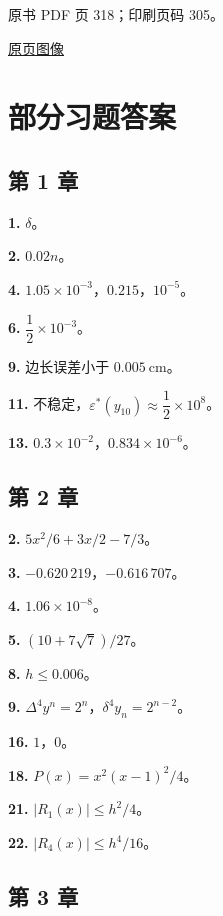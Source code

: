 \clearpage

原书 PDF 页 318；印刷页码 305。

\href{source-images/pdf-318.jpeg}{原页图像}

\section{部分习题答案}\label{back-ux90e8ux5206ux4e60ux9898ux7b54ux6848}

\subsection{第 1 章}\label{back-ux7b2c-1-ux7ae0}

\textbf{1.} \(\delta\)。

\textbf{2.} \(0.02n\)。

\textbf{4.} \(1.05\times10^{-3}\)，\(0.215\)，\(10^{-5}\)。

\textbf{6.} \(\dfrac{1}{2}\times10^{-3}\)。

\textbf{9.} 边长误差小于 \(0.005\ \mathrm{cm}\)。

\textbf{11.} 不稳定，\(\varepsilon^*(y_{10})\approx\dfrac{1}{2}\times10^8\)。

\textbf{13.} \(0.3\times10^{-2}\)，\(0.834\times10^{-6}\)。

\subsection{第 2 章}\label{back-ux7b2c-2-ux7ae0}

\textbf{2.} \(5x^2/6+3x/2-7/3\)。

\textbf{3.} \(-0.620\,219\)，\(-0.616\,707\)。

\textbf{4.} \(1.06\times10^{-8}\)。

\textbf{5.} \((10+7\sqrt{7})/27\)。

\textbf{8.} \(h\leqslant0.006\)。

\textbf{9.} \(\Delta^4y^n=2^n\)，\(\delta^4y_n=2^{n-2}\)。

\textbf{16.} \(1\)，\(0\)。

\textbf{18.} \(P(x)=x^2(x-1)^2/4\)。

\textbf{21.} \(|R_1(x)|\leqslant h^2/4\)。

\textbf{22.} \(|R_4(x)|\leqslant h^4/16\)。

\subsection{第 3 章}\label{back-ux7b2c-3-ux7ae0}

